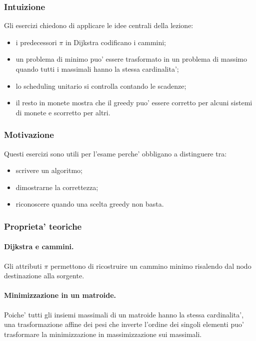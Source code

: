 \subsubsection{Intuizione}
Gli esercizi chiedono di applicare le idee centrali della lezione:
\begin{itemize}
	\item i predecessori $\pi$ in Dijkstra codificano i cammini;
	\item un problema di minimo puo' essere trasformato in un problema di massimo quando tutti i massimali hanno la stessa cardinalita';
	\item lo scheduling unitario si controlla contando le scadenze;
	\item il resto in monete mostra che il greedy puo' essere corretto per alcuni sistemi di monete e scorretto per altri.
\end{itemize}

\subsubsection{Motivazione}
Questi esercizi sono utili per l'esame perche' obbligano a distinguere tra:
\begin{itemize}
	\item scrivere un algoritmo;
	\item dimostrarne la correttezza;
	\item riconoscere quando una scelta greedy non basta.
\end{itemize}

\subsubsection{Proprieta' teoriche}
\paragraph{Dijkstra e cammini.}
Gli attributi $\pi$ permettono di ricostruire un cammino minimo risalendo dal nodo destinazione alla sorgente.

\paragraph{Minimizzazione in un matroide.}
Poiche' tutti gli insiemi massimali di un matroide hanno la stessa cardinalita', una trasformazione affine dei pesi che inverte l'ordine dei singoli elementi puo' trasformare la minimizzazione in massimizzazione sui massimali.

